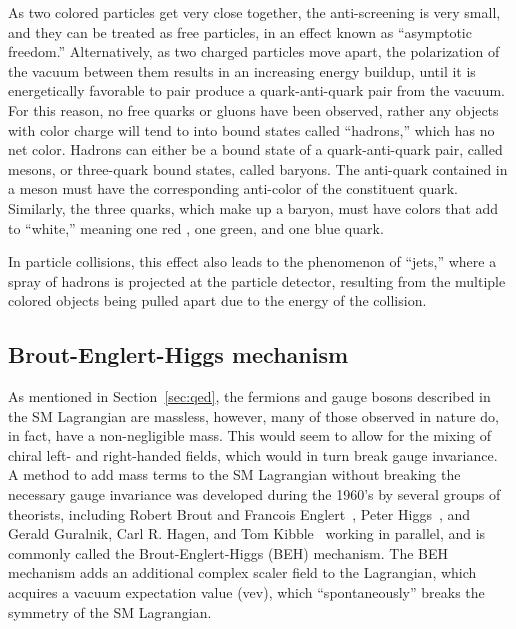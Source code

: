 As two colored particles get very close together, the anti-screening is very
small, and they can be treated as free particles, in an effect known as
``asymptotic freedom.''
Alternatively, as two charged particles move apart, the polarization of the
vacuum between them results in an increasing energy buildup, until it is
energetically favorable to pair produce a quark-anti-quark pair from the vacuum.
For this reason, no free quarks or gluons have been observed, rather any
objects with color charge will tend to into bound states called ``hadrons,''
which has no net color.
Hadrons can either be a bound state of a quark-anti-quark pair, called mesons,
or three-quark bound states, called baryons.
The anti-quark contained in a meson must have the corresponding anti-color of 
the constituent quark.
Similarly, the three quarks, which make up a baryon, must have colors that add
to ``white,'' meaning one red , one green, and one blue quark.

In particle collisions, this effect also leads to the phenomenon of ``jets,''
where a spray of hadrons is projected at the particle detector, resulting from
the multiple colored objects being pulled apart due to the energy of the
collision.

\FloatBarrier
\subsection{Brout-Englert-Higgs mechanism}
\label{sec:higgs}

As mentioned in Section~\ref{sec:qed}, the fermions and gauge bosons described
in the SM Lagrangian are massless, however, many of those observed in nature
do, in fact, have a non-negligible mass.
This would seem to allow for the mixing of chiral left- and right-handed
fields, which would in turn break gauge invariance.
A method to add mass terms to the SM Lagrangian without breaking the necessary
gauge invariance was developed during the 1960's by several groups of theorists,
including Robert Brout and Francois Englert~\cite{PhysRevLett.13.321},
Peter Higgs~\cite{Higgs1964132,PhysRevLett.13.508},
and Gerald Guralnik, Carl R. Hagen, and Tom Kibble~\cite{PhysRevLett.13.585}
working in parallel, and is commonly called the Brout-Englert-Higgs (BEH)
mechanism.
The BEH mechanism adds an additional complex scaler field to the Lagrangian,
which acquires a vacuum expectation value (vev), which ``spontaneously''
breaks the symmetry of the SM Lagrangian.

